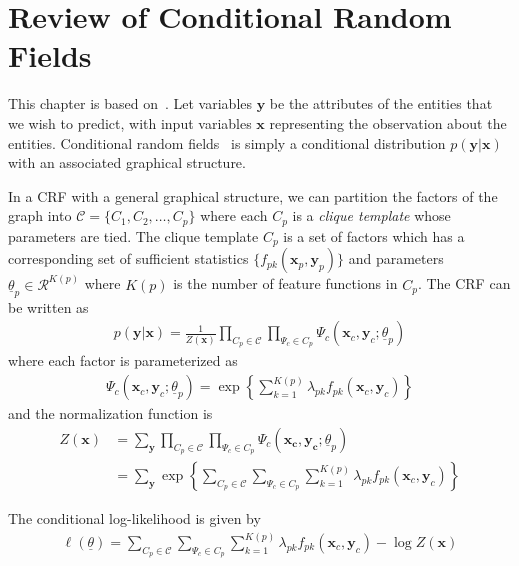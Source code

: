 \chapter{Review of Conditional Random Fields}\label{app:crf}
This chapter is based on~\cite{sutton06}. Let variables $\mathbf{y}$ be the
attributes of the entities that we wish to predict, with input variables
$\mathbf{x}$ representing the observation about the entities. Conditional random
fields~\cite{lafferty01} is simply a conditional distribution $p(\mathbf{y}|\mathbf{x})$ with an
associated graphical structure. 

In a CRF with a general graphical structure, we can partition the factors of the
graph into $\mathcal{C}=\{C_1, C_2, \ldots, C_p\}$ where each $C_p$ is a 
\textit{clique template} whose parameters are tied.
The clique template $C_p$ is a set of factors which has a corresponding set of sufficient
statistics $\{f_{pk}(\mathbf{x}_p, \mathbf{y}_p)\}$ and parameters
$\underline{\theta}_p\in \mathcal{R}^{K(p)}$ where $K(p)$ is the number of
feature functions in $C_p$.
The CRF can be written as
\begin{align*}
p(\mathbf{y}|\mathbf{x}) = \frac{1}{Z(\mathbf{x})}\prod_{C_p\in
\mathcal{C}}\prod_{\Psi_c\in C_p}\Psi_c(\mathbf{x}_c,
\mathbf{y}_c;\underline{\theta}_p)
\end{align*}
where each factor is parameterized as
\begin{align*}
\Psi_c(\mathbf{x}_c, \mathbf{y}_c;
\underline{\theta}_p) =
\exp\left\{\sum_{k=1}^{K(p)}\lambda_{pk}f_{pk}(\mathbf{x}_c,
\mathbf{y}_c)\right\}
\end{align*}
and the normalization function is
\begin{align*}
Z(\mathbf{x})
&= \sum_{\mathbf{y}}\prod_{C_p\in\mathcal{C}}\prod_{\Psi_c\in
C_p}\Psi_c(\mathbf{x_c}, \mathbf{y_c}; \underline{\theta}_p)\\
&= \sum_{\mathbf{y}}\exp\left\{\sum_{C_p\in\mathcal{C}}\sum_{\Psi_c\in
C_p}\sum_{k=1}^{K(p)}\lambda_{pk}f_{pk}(\mathbf{x}_c,
\mathbf{y}_c)\right\}
\end{align*}

The conditional log-likelihood is given by
\begin{align*}
\ell(\underline{\theta}) = \sum_{C_p\in\mathcal{C}}\sum_{\Psi_c\in
C_p}\sum_{k=1}^{K(p)}\lambda_{pk}f_{pk}(\mathbf{x}_c, \mathbf{y}_c) - \log Z(\mathbf{x})
\end{align*}

